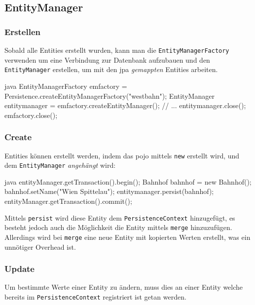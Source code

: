 \clearpage
\subsection{EntityManager}

\subsubsection{Erstellen}

Sobald alle Entities erstellt wurden, kann man die \texttt{EntityManagerFactory} \cite{jdoc:entityManagerFactory} verwenden um eine Verbindung zur Datenbank aufzubauen und den \texttt{EntityManager} \cite{jdoc:entityManager} erstellen, um mit den \gls{jpa} \textit{gemappten} Entities arbeiten.

\begin{code}{java}
EntityManagerFactory emfactory = Persistence.createEntityManagerFactory("westbahn");
EntityManager entitymanager = emfactory.createEntityManager();
// ...
entitymanager.close();
emfactory.close();
\end{code}

\subsubsection{Create}

Entities können erstellt werden, indem das \gls{pojo} mittels \texttt{new} erstellt wird, und dem \texttt{EntityManager} \textit{angehängt} wird:

\begin{code}{java}
entityManager.getTransaction().begin();
Bahnhof bahnhof = new Bahnhof();
bahnhof.setName("Wien Spittelau");
entitymanager.persist(bahnhof);
entityManager.getTransaction().commit();
\end{code}

Mittels \texttt{persist} wird diese Entity dem \texttt{PersistenceContext} hinzugefügt, es besteht jedoch auch die Möglichkeit die Entity mittels \texttt{merge} hinzuzufügen. Allerdings wird bei \texttt{merge} eine neue Entity mit kopierten Werten erstellt, was ein unnötiger Overhead ist.

\subsubsection{Update}

Um bestimmte Werte einer Entity zu ändern, muss dies an einer Entity welche bereits im \texttt{PersistenceContext} registriert ist getan werden.

